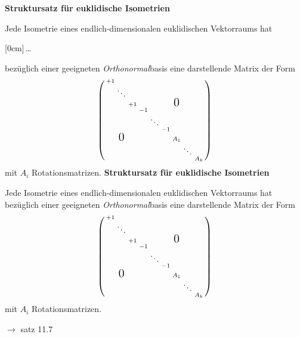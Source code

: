 \documentclass[11pt]{article}
\renewcommand{\cite}[1]{\par\bigskip\hfill{\color{gray}\tiny\(\to\) #1}}
\newcommand{\hide}[1]{\parbox{0cm}{\raisebox{-7pt}[0cm]{\dots}}\color{white}#1\color{black}}
\let\olddots\dots
\renewcommand{\dots}{\,\olddots\,}
\newenvironment{field}{}{\newpage}
\newif\ifnote
\newenvironment{note}{\notetrue}{\notefalse}
\begin{document}
\begin{note}
    \begin{field}
        \textbf{Struktursatz für euklidische Isometrien}

        Jede Isometrie eines endlich-dimensionalen euklidischen Vektorraums hat \hide{bezüglich einer geeigneten \emph{Orthonormal}basis} eine darstellende Matrix der Form
        \[\left(\begin{smallmatrix}
            +1 \\
              & \ddots \\
              &        & +1 &  &       &  &     \mbox{\Large 0}\\
              &        &    &-1\\
              &        &    &  &\ddots\\
              &        &    &  &       &-1\\
              &\mbox{\Large 0}&    &  &       &  & A_1\\
              &        &    &  &       &  &     &\ddots\\
              &        &    &  &       &  &     &       & A_k\\
        \end{smallmatrix}\right)\]
        mit \(A_i\) Rotationsmatrizen.
    \end{field}
    \begin{field}
        \textbf{Struktursatz für euklidische Isometrien}

        Jede Isometrie eines endlich-dimensionalen euklidischen Vektorraums hat bezüglich einer geeigneten \emph{Orthonormal}basis eine darstellende Matrix der Form
        \[\left(\begin{smallmatrix}
            +1 \\
              & \ddots \\
              &        & +1 &  &       &  &     \mbox{\Large 0}\\
              &        &    &-1\\
              &        &    &  &\ddots\\
              &        &    &  &       &-1\\
              &\mbox{\Large 0}&    &  &       &  & A_1\\
              &        &    &  &       &  &     &\ddots\\
              &        &    &  &       &  &     &       & A_k\\
        \end{smallmatrix}\right)\]
        mit \(A_i\) Rotationsmatrizen.
        \cite{satz 11.7}
    \end{field}


\end{note}
\end{document}
